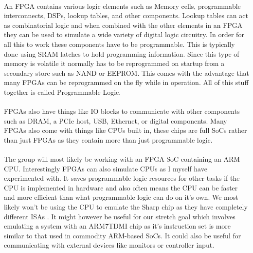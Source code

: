 \documentclass[twocolumn]{article}
\begin{document}
\paragraph{}An FPGA contains various logic elements such as Memory cells, programmable interconnects, DSPs, lookup tables\autocite{vaughn}, and other components. Lookup tables can act as combinatorial logic \autocite{moore_2019} and when combined with the other elements in an FPGA they can be used to simulate a wide variety of digital logic circuitry. In order for all this to work these components have to be programmable. This is typically done using SRAM latches \cite{vaughn} to hold programming information. Since this type of memory is volatile it normally has to be reprogrammed on startup from a secondary store such as NAND or EEPROM. This comes with the advantage that many FPGAs can be reprogrammed on the fly while in operation. All of this stuff together is called Programmable Logic.

\paragraph{}FPGAs also have things like IO blocks to communicate with other components such as DRAM, a PCIe host, USB, Ethernet, or digital components. Many FPGAs also come with things like CPUs built in, these chips are full SoCs rather than just FPGAs as they contain more than just programmable logic.

\paragraph{}The group will most likely be working with an FPGA SoC containing an ARM CPU. Interestingly FPGAs can also simulate CPUs as I myself have experimented with. It saves programmable logic resources for other tasks if the CPU is implemented in hardware and also often means the CPU can be faster and more efficient than what programmable logic can do on it's own. We most likely won't be using the CPU to emulate the Sharp chip as they have completely different ISAs \autocite{realboy-emulator}\autocite{ARMISA}. It might however be useful for our stretch goal which involves emulating a system with an ARM7TDMI chip as it's instruction set is more similar to that used in commodity ARM-based SoCs. It could also be useful for communicating with external devices like monitors or controller input.
\end{document}

